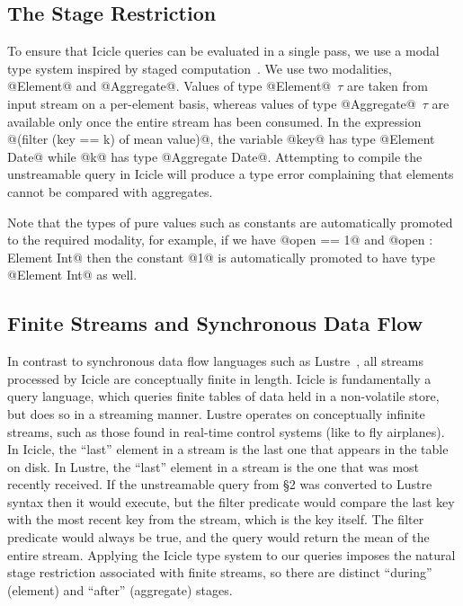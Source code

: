 \subsection{The Stage Restriction}
To ensure that Icicle queries can be evaluated in a single pass, we use a modal type system inspired by staged computation~\cite{davies2001modal}. We use two modalities, @Element@ and @Aggregate@. Values of type @Element@~$\tau$ are taken from input stream on a per-element basis, whereas values of type @Aggregate@~$\tau$ are available only once the entire stream has been consumed. In the expression @(filter (key == k) of mean value)@, the variable @key@ has type @Element Date@ while @k@ has type @Aggregate Date@. Attempting to compile the unstreamable query in Icicle will produce a type error complaining that elements cannot be compared with aggregates.

Note that the types of pure values such as constants are automatically promoted to the required modality, for example, if we have @open == 1@ and @open : Element Int@ then the constant @1@ is automatically promoted to have type @Element Int@ as well.


\subsection{Finite Streams and Synchronous Data Flow}
In contrast to synchronous data flow languages such as {\sc Lustre}~\cite{halbwachs1991synchronous}, all streams processed by Icicle are conceptually finite in length. Icicle is fundamentally a query language, which queries finite tables of data held in a non-volatile store, but does so in a streaming manner. Lustre operates on conceptually infinite streams, such as those found in real-time control systems (like to fly airplanes). In Icicle, the ``last'' element in a stream is the last one that appears in the table on disk. In Lustre, the ``last'' element in a stream is the one that was most recently received. If the unstreamable query from \S2 was converted to Lustre syntax then it would execute, but the filter predicate would compare the last key with the most recent key from the stream, which is the key itself. The filter predicate would always be true, and the query would return the mean of the entire stream. Applying the Icicle type system to our queries imposes the natural stage restriction associated with finite streams, so there are distinct ``during'' (element) and ``after'' (aggregate) stages.


